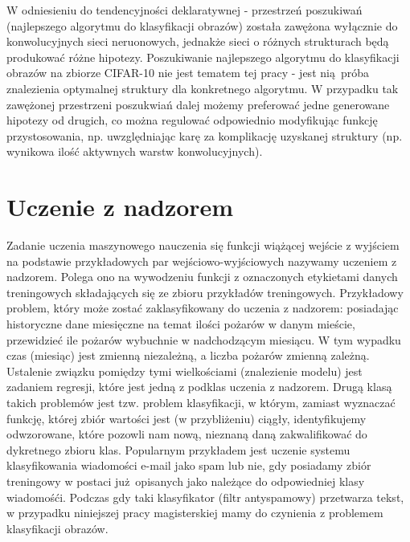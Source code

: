W odniesieniu do tendencyjności deklaratywnej - przestrzeń poszukiwań (najlepszego algorytmu do klasyfikacji obrazów) została zawężona wyłącznie do konwolucyjnych sieci neruonowych, jednakże sieci o różnych strukturach będą produkować różne hipotezy.
Poszukiwanie najlepszego algorytmu do klasyfikacji obrazów na zbiorze CIFAR-10 nie jest tematem tej pracy - jest nią próba znalezienia optymalnej struktury dla konkretnego algorytmu.
W przypadku tak zawężonej przestrzeni poszukwiań dalej możemy preferować jedne generowane hipotezy od drugich, co można regulować odpowiednio modyfikując funkcję przystosowania, np. uwzględniając karę za komplikację uzyskanej struktury (np. wynikowa ilość aktywnych warstw konwolucyjnych).
\section{Uczenie z nadzorem}\label{supervised_learning}
Zadanie uczenia maszynowego nauczenia się funkcji wiążącej wejście z wyjściem na podstawie przykładowych par wejściowo-wyjściowych nazywamy uczeniem z nadzorem. \cite{russell2010artificial}
Polega ono na wywodzeniu funkcji z oznaczonych etykietami danych treningowych składających się ze zbioru przykładów treningowych. \cite{mohri2012foundations}
Przykładowy problem, który może zostać zaklasyfikowany do uczenia z nadzorem: posiadając historyczne dane miesięczne na temat ilości pożarów w danym mieście, przewidzieć ile pożarów wybuchnie w nadchodzącym miesiącu.
W tym wypadku czas (miesiąc) jest zmienną niezależną, a liczba pożarów zmienną zależną. Ustalenie związku pomiędzy tymi wielkościami (znalezienie modelu) jest zadaniem regresji, które jest jedną z podklas uczenia z nadzorem.
Drugą klasą takich problemów jest tzw. problem klasyfikacji, w którym, zamiast wyznaczać funkcję, której zbiór wartości jest (w przybliżeniu) ciągły, identyfikujemy odwzorowane, które pozowli nam nową, nieznaną daną zakwalifikować do dykretnego zbioru klas.
Popularnym przykładem jest uczenie systemu klasyfikowania wiadomości e-mail jako spam lub nie, gdy posiadamy zbiór treningowy w postaci już opisanych jako należące do odpowiedniej klasy wiadomośći.
Podczas gdy taki klasyfikator (filtr antyspamowy) przetwarza tekst, w przypadku niniejszej pracy magisterskiej mamy do czynienia z problemem klasyfikacji obrazów.
